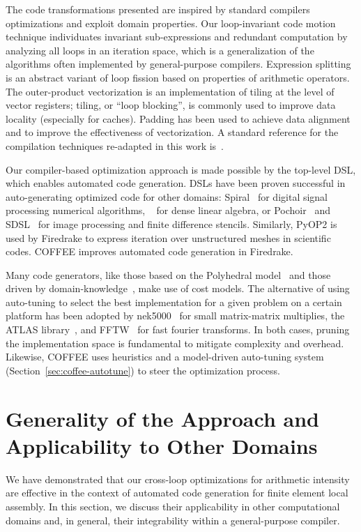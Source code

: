 The code transformations presented are inspired by standard compilers optimizations and exploit domain properties. Our loop-invariant code motion technique individuates invariant sub-expressions and redundant computation by analyzing all loops in an iteration space, which is a generalization of the algorithms often implemented by general-purpose compilers. Expression splitting is an abstract variant of loop fission based on properties of arithmetic operators. The outer-product vectorization is an implementation of tiling at the level of vector registers; tiling, or ``loop blocking'', is commonly used to improve data locality (especially for caches). Padding has been used to achieve data alignment and to improve the effectiveness of vectorization. A standard reference for the compilation techniques re-adapted in this work is~\citep{dragonbook}.

Our compiler-based optimization approach is made possible by the top-level DSL, which enables automated code generation. DSLs have been proven successful in auto-generating optimized code for other domains: Spiral~\citep{Pueschel:05} for digital signal processing numerical algorithms, ~\citep{Spampinato:14} for dense linear algebra, or Pochoir~\citep{pochoir} and SDSL~\citep{stencil-compiler} for image processing and finite difference stencils. Similarly, PyOP2 is used by Firedrake to express iteration over unstructured meshes in scientific codes. COFFEE improves automated code generation in Firedrake.

Many code generators, like those based on the Polyhedral model~\citep{pluto} and those driven by domain-knowledge~\citep{modeldriven}, make use of cost models. The alternative of using auto-tuning to select the best implementation for a given problem on a certain platform has been adopted by nek5000~\citep{nek5000} for small matrix-matrix multiplies, the ATLAS library~\citep{ATLAS}, and FFTW~\citep{FFTW} for fast fourier transforms. In both cases, pruning the implementation space is fundamental to mitigate complexity and overhead. Likewise, COFFEE uses heuristics and a model-driven auto-tuning system (Section~\ref{sec:coffee-autotune}) to steer the optimization process.


\section{Generality of the Approach and Applicability to Other Domains}
\label{sec:generality}
We have demonstrated that our cross-loop optimizations for arithmetic intensity are effective in the context of automated code generation for finite element local assembly. In this section, we discuss their applicability in other computational domains and, in general, their integrability within a general-purpose compiler.

